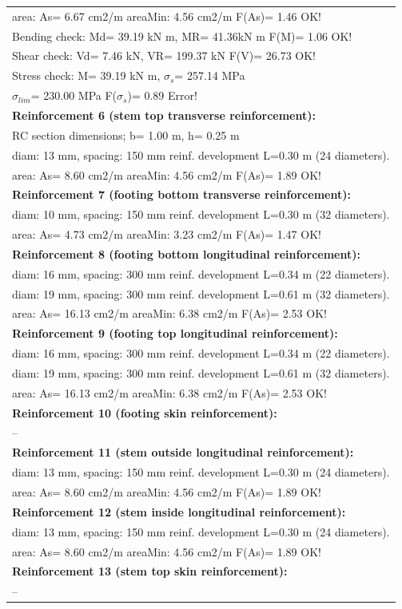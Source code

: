 \begin{center}
\begin{supertabular}[H]{|l|}
  area: As=   6.67 cm2/m areaMin:   4.56 cm2/m  F(As)= 1.46 OK!\\
  Bending check: Md=  39.19 kN m, MR=  41.36kN m  F(M)= 1.06 OK!\\
  Shear check: Vd=   7.46 kN,  VR= 199.37 kN  F(V)= 26.73 OK!\\
  Stress check: M=  39.19 kN m, $\sigma_s$= 257.14 MPa\\
    $\sigma_{lim}$= 230.00 MPa  F($\sigma_s$)= 0.89 Error!\\
\textbf{Reinforcement 6 (stem top transverse reinforcement):}\\
  RC section dimensions; b= 1.00 m, h= 0.25 m\\
  diam: 13 mm, spacing: 150 mm  reinf. development L=0.30 m (24 diameters).\\
  area: As=   8.60 cm2/m areaMin:   4.56 cm2/m  F(As)= 1.89 OK!\\
\textbf{Reinforcement 7 (footing bottom transverse reinforcement):}\\
  diam: 10 mm, spacing: 150 mm  reinf. development L=0.30 m (32 diameters).\\
  area: As=   4.73 cm2/m areaMin:   3.23 cm2/m  F(As)= 1.47 OK!\\
\textbf{Reinforcement 8 (footing bottom longitudinal reinforcement):}\\
  diam: 16 mm, spacing: 300 mm  reinf. development L=0.34 m (22 diameters).\\
  diam: 19 mm, spacing: 300 mm  reinf. development L=0.61 m (32 diameters).\\
  area: As=  16.13 cm2/m areaMin:   6.38 cm2/m  F(As)= 2.53 OK!\\
\textbf{Reinforcement 9 (footing top longitudinal reinforcement):}\\
  diam: 16 mm, spacing: 300 mm  reinf. development L=0.34 m (22 diameters).\\
  diam: 19 mm, spacing: 300 mm  reinf. development L=0.61 m (32 diameters).\\
  area: As=  16.13 cm2/m areaMin:   6.38 cm2/m  F(As)= 2.53 OK!\\
\textbf{Reinforcement 10 (footing skin reinforcement):}\\
  --\\
\textbf{Reinforcement 11 (stem outside longitudinal reinforcement):}\\
  diam: 13 mm, spacing: 150 mm  reinf. development L=0.30 m (24 diameters).\\
  area: As=   8.60 cm2/m areaMin:   4.56 cm2/m  F(As)= 1.89 OK!\\
\textbf{Reinforcement 12 (stem inside longitudinal reinforcement):}\\
  diam: 13 mm, spacing: 150 mm  reinf. development L=0.30 m (24 diameters).\\
  area: As=   8.60 cm2/m areaMin:   4.56 cm2/m  F(As)= 1.89 OK!\\
\textbf{Reinforcement 13 (stem top skin reinforcement):}\\
  --\\
\hline
\end{supertabular}
\end{center}
